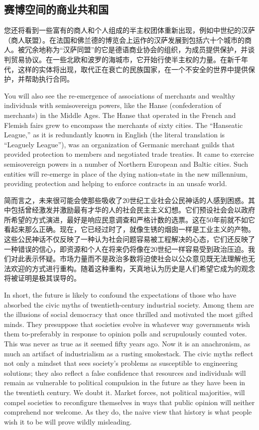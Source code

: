 \subsection{赛博空间的商业共和国}
\begin{paracol}{2}
您还将看到一些富有的商人和个人组成的半主权团体重新出现，例如中世纪的汉萨（商人联盟）。在法国和佛兰德的博览会上运作的汉萨发展到包括六十个城市的商人。被冗余地称为“汉萨同盟”的它是德语商业协会的组织，为成员提供保护，并谈判贸易协议。在一些北欧和波罗的海城市，它开始行使半主权的力量。在新千年代，这样的实体将出现，取代正在衰亡的民族国家，在一个不安全的世界中提供保护，并帮助执行合同。

\switchcolumn
You will also see the re-emergence of associations of merchants and wealthy individuals with semisovereign powers, like the Hanse (confederation of merchants) in the Middle Ages. The Hanse that operated in the French and Flemish fairs grew to encompass the merchants of sixty cities. The ``Hanseatic League,'' as it is redundantly known in English (the literal translation is ``Leaguely League''), was an organization of Germanic merchant guilds that provided protection to members and negotiated trade treaties. It came to exercise\\ semisovereign powers in a number of Northern European and Baltic cities. Such entities will re-emerge in place of the dying nation-state in the new millennium, providing protection and helping to enforce contracts in an unsafe world.

\switchcolumn*
简而言之，未来很可能会使那些吸收了20世纪工业社会公民神话的人感到困惑。其中包括曾经激发并激励最有才华的人的社会民主主义幻想。它们预设社会会以政府所希望的方式演进，最好是响应民意调查和严格计数的选票。这在50年前就不如它看起来那么正确。现在，它已经过时了，就像生锈的烟囱一样是工业主义的产物。这些公民神话不仅反映了一种认为社会问题容易被工程解决的心态，它们还反映了一种错误的信心，即资源和个人在将来仍将像在20世纪一样容易受到政治压迫。我们对此表示怀疑。市场力量而不是政治多数将迫使社会以公众意见既无法理解也无法欢迎的方式进行重构。随着这种重构，天真地认为历史是人们希望它成为的观念将被证明是极其误导的。

\switchcolumn
In short, the future is likely to confound the expectations of those who have absorbed the civic myths of twentieth-century industrial society. Among them are the illusions of social democracy that once thrilled and motivated the most gifted minds. They presuppose that societies evolve in whatever way governments wish them to-preferably in response to opinion polls and scrupulously counted votes. This was never as true as it seemed fifty years ago. Now it is an anachronism, as much an artifact of industrialism as a rusting smokestack. The civic myths reflect not only a mindset that sees society's problems as susceptible to engineering solutions; they also reflect a false confidence that resources and individuals will remain as vulnerable to political compulsion in the future as they have been in the twentieth century. We doubt it. Market forces, not political majorities, will compel societies to reconfigure themselves in ways that public opinion will neither comprehend nor welcome. As they do, the naive view that history is what people wish it to be will prove wildly misleading. 


\end{paracol}
